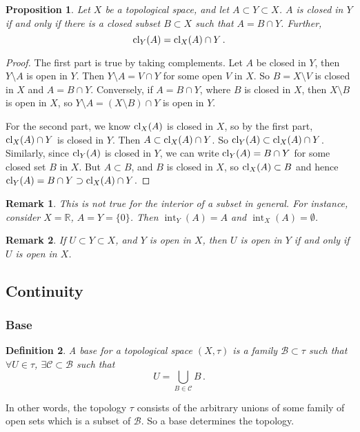 \documentclass{article}
\theoremstyle{plain}\theoremheaderfont{\normalfont\itshape}\theorembodyfont{\rmfamily}\theoremseparator{.}\newtheorem*{rem}{Remark}\newtheorem*{ex}{Example}\newtheorem*{proof}{Proof}\newtheorem*{altp}{Alternative proof}
\theoremstyle{plain}\theoremheaderfont{\normalfont\bfseries}\theorembodyfont{\rmfamily}\theoremseparator{.}\newtheorem{thm}{Theorem}[section]\newtheorem{lem}[thm]{Lemma}\newtheorem{prop}[thm]{Proposition}\newtheorem*{cor}{Corollary}\newtheorem{defn}[thm]{Definition}\newtheorem{clm}[thm]{Claim}\newtheorem{clminproof}{Claim}
\theoremstyle{break}\theoremheaderfont{\normalfont\itshape}\theorembodyfont{\rmfamily}\theoremseparator{.\medskip}\newtheorem*{proofskip}{Proof}\newtheorem*{exs}{Examples}\newtheorem*{rems}{Remarks}
\theoremstyle{break}\theoremheaderfont{\normalfont\bfseries}\theorembodyfont{\rmfamily}\theoremseparator{.\medskip}\newtheorem{lemskip}[thm]{Lemma}\newtheorem{defnskip}[thm]{Definition}\newtheorem{propskip}[thm]{Proposition}\newtheorem{thmskip}[thm]{Theorem}
\DeclareMathOperator{\cl}{cl}
\DeclareMathOperator{\inter}{int}
\begin{document}
    \begin{prop}
        Let \(X\) be a topological space, and let \(A\subset Y\subset X\). \(A\) is closed in \(Y\) if and only if there is a closed subset \(B\subset X\) such that \(A=B\cap Y\). Further,
        \[\cl_Y(A)=\cl_X(A)\cap Y\,.\]        
    \end{prop}
    \begin{proof}
        The first part is true by taking complements. Let \(A\) be closed in \(Y\), then \(Y\setminus A\) is open in \(Y\). Then \(Y\setminus A=V\cap Y\) for some open \(V\) in \(X\). So \(B=X\setminus V\) is closed in \(X\) and \(A=B\cap Y\). Conversely, if \(A=B\cap Y\), where \(B\) is closed in \(X\), then \(X\setminus B\) is open in \(X\), so \(Y\setminus A=(X\setminus B)\cap Y\) is open in \(Y\).

        For the second part, we know \(\cl_X(A)\) is closed in \(X\), so by the first part, \(\cl_X(A)\cap Y\) is closed in \(Y\). Then \(A\subset \cl_X(A)\cap Y\). So \(\cl_Y(A)\subset \cl_X(A)\cap Y\). Similarly, since \(\cl_Y(A)\) is closed in \(Y\), we can write \(\cl_Y(A)=B\cap Y\) for some closed set \(B\) in \(X\). But \(A\subset B\), and \(B\) is closed in \(X\), so \(\cl_X(A)\subset B\) and hence \(\cl_Y(A)=B\cap Y\supset\cl_X(A)\cap Y\).
    \end{proof}
    \begin{rem}
        This is not true for the interior of a subset in general. For instance, consider \(X=\mathbb{R}\), \(A=Y=\{0\}\). Then \(\inter_Y(A)=A\) and \(\inter_X(A)=\emptyset\).
    \end{rem}
    \begin{rem}
        If \(U\subset Y\subset X\), and \(Y\) is open in \(X\), then \(U\) is open in \(Y\) if and only if \(U\) is open in \(X\).
    \end{rem}
    \subsection{Continuity}
    \subsubsection{Base}
    \begin{defn}
        A \textit{base} for a topological space \((X,\tau)\) is a family \(\mathscr{B}\subset\tau\) such that \(\forall U\in\tau\), \(\exists\mathscr{C}\subset\mathscr{B}\) such that
        \[U=\bigcup_{B\in\mathscr{C}}B\,.\]
    \end{defn}
    In other words, the topology \(\tau\) consists of the arbitrary unions of some family of open sets which is a subset of \(\mathscr{B}\). So a base determines the topology.
    
\end{document}

